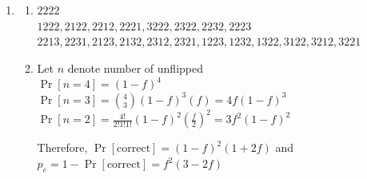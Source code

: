 \documentclass[12pt, a4paper]{article}
\begin{document}
\begin{enumerate}[Q\arabic*.]
  \item 
    \begin{enumerate}
      \item $2222$\\ 
        $1222, 2122, 2212, 2221, 3222, 2322, 2232, 2223$\\ 
        $2213, 2231, 2123, 2132, 2312, 2321, 1223, 1232, 1322, 3122, 3212, 3221$

      \item Let $n$ denote number of unflipped\\ 
        $\Pr[n=4] = (1-f)^4$\\ 
        $\Pr[n=3] = \binom 43 (1-f)^3(f) = 4f(1-f)^3$\\ 
        $\Pr[n=2] = \frac{4!}{2!1!1!}(1-f)^2(\frac{f}{2})^2 = 3f^2(1-f)^2$

        Therefore, $\Pr[\text{correct}] = (1-f)^2(1+2f)$ and $p_e = 1 - \Pr[\text{correct}] = f^2(3-2f)$
    \end{enumerate}
\end{enumerate}
\end{document}
